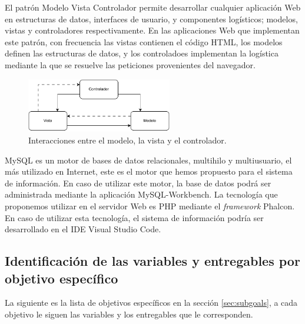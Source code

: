 \documentclass[a4paper, 9pt, conference]{article}              %
\theoremstyle{definition}
\begin{document}
El patr\'on Modelo Vista Controlador permite desarrollar cualquier aplicaci\'on Web en estructuras de datos, interfaces de usuario, y componentes log\'isticos; modelos, vistas y controladores respectivamente. En las aplicaciones Web que implementan este patr\'on, con frecuencia las vistas contienen el c\'odigo HTML, los modelos definen las estructuras de datos, y los controladoes implementan la log\'istica mediante la que se resuelve las peticiones provenientes del navegador.

\begin{figure}[H]
	\centering
		\includegraphics[width=240px, keepaspectratio=false]{mvc}
			\caption{Interacciones entre el modelo, la vista y el controlador.}
	\label{mvc}
\end{figure}

MySQL es un motor de bases de datos relacionales, multihilo y multiusuario, el m\'as utilizado en Internet, este es el motor que hemos propuesto para el sistema de informaci\'on. En caso de utilizar este motor, la base de datos podr\'a ser administrada mediante la aplicaci\'on MySQL-Workbench. La tecnolog\'ia que proponemos utilizar en el servidor Web es PHP mediante el \emph{framework} Phalcon. En caso de utilizar esta tecnolog\'ia, el sistema de informaci\'on podr\'ia ser desarrollado en el IDE Visual Studio Code.

\subsection{Identificaci\'on de las variables y entregables por objetivo espec\'ifico}

La siguiente es la lista de objetivos espec\'ificos en la secci\'on \ref{sec:subgoals}, a cada objetivo le siguen las variables y los entregables que le corresponden.
\end{document}
